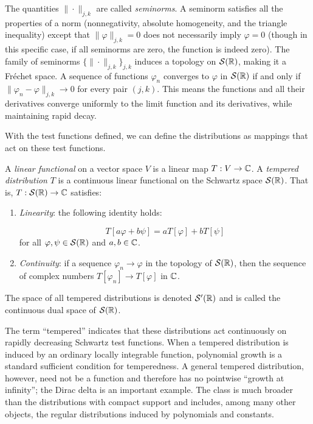 \begin{remark}
The quantities $\|\cdot\|_{j,k}$ are called \textit{seminorms}. A seminorm satisfies all the properties of a norm (nonnegativity, absolute homogeneity, and the triangle inequality) except that $\|\varphi\|_{j,k} = 0$ does not necessarily imply $\varphi = 0$ (though in this specific case, if all seminorms are zero, the function is indeed zero).
The family of seminorms $\{\|\cdot\|_{j,k}\}_{j,k}$ induces a topology on $\mathcal{S}(\mathbb{R})$, making it a Fréchet space. A sequence of functions $\varphi_n$ converges to $\varphi$ in $\mathcal{S}(\mathbb{R})$ if and only if $\|\varphi_n - \varphi\|_{j,k} \to 0$ for every pair $(j,k)$. This means the functions and all their derivatives converge uniformly to the limit function and its derivatives, while maintaining rapid decay.
\end{remark}


With the test functions defined, we can define the distributions as mappings that act on these test functions.

\begin{definition}
A \textit{linear functional} on a vector space $V$ is a linear map $T: V \to \mathbb{C}$.
A \textit{tempered distribution} $T$ is a continuous linear functional on the Schwartz space $\mathcal{S}(\mathbb{R})$. That is, $T: \mathcal{S}(\mathbb{R}) \to \mathbb{C}$ satisfies:
\begin{enumerate}
\item \textit{Linearity}: the following identity holds:

\[
T[a\varphi + b\psi] = a T[\varphi] + b T[\psi]
\]
for all $\varphi, \psi \in \mathcal{S}(\mathbb{R})$ and $a, b \in \mathbb{C}$.
\item \textit{Continuity}: if a sequence $\varphi_n \to \varphi$ in the topology of $\mathcal{S}(\mathbb{R})$, then the sequence of complex numbers $T[\varphi_n] \to T[\varphi]$ in $\mathbb{C}$.
\end{enumerate}
The space of all tempered distributions is denoted $\mathcal{S}'(\mathbb{R})$ and is called the continuous dual space of $\mathcal{S}(\mathbb{R})$.
\end{definition}

\begin{remark}
The term ``tempered'' indicates that these distributions act continuously on rapidly decreasing Schwartz test functions. When a tempered distribution is induced by an ordinary locally integrable function, polynomial growth is a standard sufficient condition for temperedness. A general tempered distribution, however, need not be a function and therefore has no pointwise ``growth at infinity''; the Dirac delta is an important example. The class is much broader than the distributions with compact support and includes, among many other objects, the regular distributions induced by polynomials and constants.
\end{remark}


